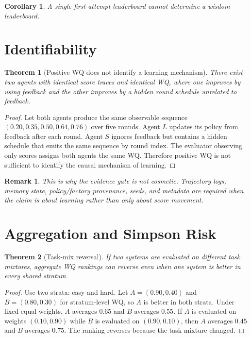\documentclass[11pt]{article}
\newtheorem{theorem}{Theorem}
\newtheorem{corollary}{Corollary}
\newtheorem{remark}{Remark}
\begin{document}
\begin{corollary}
A single first-attempt leaderboard cannot determine a wisdom leaderboard.
\end{corollary}

\section{Identifiability}

\begin{theorem}[Positive WQ does not identify a learning mechanism]
There exist two agents with identical score traces and identical WQ, where one improves by using feedback and the other improves by a hidden round schedule unrelated to feedback.
\end{theorem}

\begin{proof}
Let both agents produce the same observable sequence $(0.20,0.35,0.50,0.64,0.76)$ over five rounds.
Agent $L$ updates its policy from feedback after each round.
Agent $S$ ignores feedback but contains a hidden schedule that emits the same sequence by round index.
The evaluator observing only scores assigns both agents the same WQ.
Therefore positive WQ is not sufficient to identify the causal mechanism of learning.
\end{proof}

\begin{remark}
This is why the evidence gate is not cosmetic.
Trajectory logs, memory state, policy/factory provenance, seeds, and metadata are required when the claim is about learning rather than only about score movement.
\end{remark}

\section{Aggregation and Simpson Risk}

\begin{theorem}[Task-mix reversal]
If two systems are evaluated on different task mixtures, aggregate WQ rankings can reverse even when one system is better in every shared stratum.
\end{theorem}

\begin{proof}
Use two strata: easy and hard.
Let $A=(0.90,0.40)$ and $B=(0.80,0.30)$ for stratum-level WQ, so $A$ is better in both strata.
Under fixed equal weights, $A$ averages $0.65$ and $B$ averages $0.55$.
If $A$ is evaluated on weights $(0.10,0.90)$ while $B$ is evaluated on $(0.90,0.10)$, then $A$ averages $0.45$ and $B$ averages $0.75$.
The ranking reverses because the task mixture changed.
\end{proof}
\end{document}
